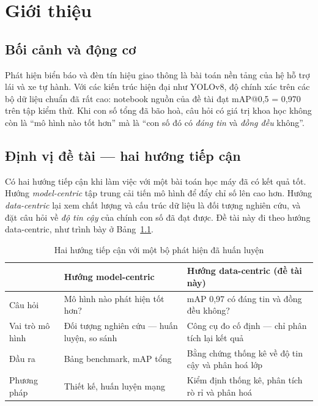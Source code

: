 \chapter{Giới thiệu}
\label{ch:gioithieu}

\section{Bối cảnh và động cơ}

Phát hiện biển báo và đèn tín hiệu giao thông là bài toán nền tảng của hệ hỗ trợ lái và xe tự
hành. Với các kiến trúc hiện đại như YOLOv8, độ chính xác trên các bộ dữ liệu chuẩn đã rất cao:
notebook nguồn của đề tài đạt mAP@0,5 = 0,970 trên tập kiểm thử. Khi con số tổng đã bão hoà, câu
hỏi có giá trị khoa học không còn là ``mô hình nào tốt hơn'' mà là ``con số đó có \emph{đáng tin}
và \emph{đồng đều} không''.

\section{Định vị đề tài --- hai hướng tiếp cận}

Có hai hướng tiếp cận khi làm việc với một bài toán học máy đã có kết quả tốt. Hướng
\emph{model-centric} tập trung cải tiến mô hình để đẩy chỉ số lên cao hơn. Hướng
\emph{data-centric} \cite{datacentric} lại xem chất lượng và cấu trúc dữ liệu là đối tượng
nghiên cứu, và đặt câu hỏi về \emph{độ tin cậy} của chính con số đã đạt được. Đề tài này đi theo
hướng data-centric, như trình bày ở Bảng~\ref{tab:phanbiet}.

\begin{table}[H]
\centering
\caption{Hai hướng tiếp cận với một bộ phát hiện đã huấn luyện}
\label{tab:phanbiet}
\small
\begin{tabularx}{\linewidth}{@{}p{3.0cm}XX@{}}
\toprule
 & \textbf{Hướng model-centric} & \textbf{Hướng data-centric (đề tài này)} \\
\midrule
Câu hỏi & Mô hình nào phát hiện tốt hơn? & mAP 0,97 có đáng tin và đồng đều không? \\
Vai trò mô hình & Đối tượng nghiên cứu --- huấn luyện, so sánh & Công cụ đo cố định --- chỉ phân
tích lại kết quả \\
Đầu ra & Bảng benchmark, mAP tổng & Bằng chứng thống kê về độ tin cậy và phân hoá lớp \\
Phương pháp & Thiết kế, huấn luyện mạng & Kiểm định thống kê, phân tích rò rỉ và phân hoá \\
\bottomrule
\end{tabularx}
\end{table}

